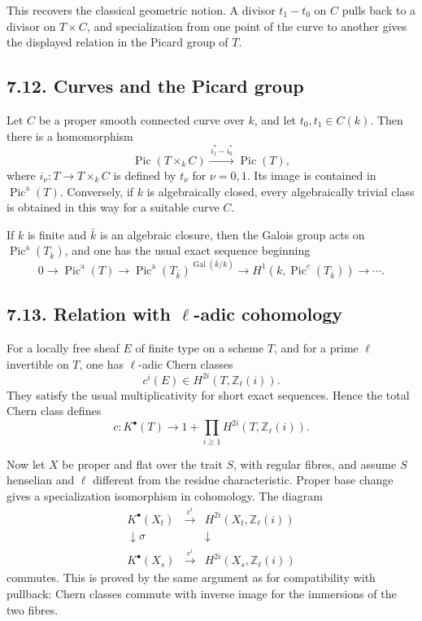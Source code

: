 \documentclass[11pt]{article}
\theoremstyle{plain}
\theoremstyle{definition}
\theoremstyle{remark}
\newcommand{\ZZ}{\mathbb Z}
\DeclareMathOperator{\Pic}{Pic}
\newcommand{\longto}{\longrightarrow}
\providecommand{\xto}[1]{\xrightarrow{#1}}
\begin{document}
This recovers the classical geometric notion. A divisor $t_1-t_0$ on $C$ pulls back to a divisor on $T\times C$, and specialization from one point of the curve to another gives the displayed relation in the Picard group of $T$.

\subsection*{7.12. Curves and the Picard group}

Let $C$ be a proper smooth connected curve over $k$, and let $t_0,t_1\in C(k)$. Then there is a homomorphism
\[
\Pic(T\times_k C)\xto{\,i_1^*-i_0^*\,}\Pic(T),
\]
where $i_\nu:T\to T\times_k C$ is defined by $t_\nu$ for $\nu=0,1$. Its image is contained in $\Pic^{\mathrm a}(T)$. Conversely, if $k$ is algebraically closed, every algebraically trivial class is obtained in this way for a suitable curve $C$.

If $k$ is finite and $\bar k$ is an algebraic closure, then the Galois group acts on $\Pic^{\mathrm a}(T_{\bar k})$, and one has the usual exact sequence beginning
\[
0\longto\Pic^{\mathrm a}(T)
\longto\Pic^{\mathrm a}(T_{\bar k})^{\operatorname{Gal}(\bar k/k)}
\longto H^1(k,\Pic^c(T_{\bar k}))\longto\cdots .
\]

\subsection*{7.13. Relation with $\ell$-adic cohomology}

For a locally free sheaf $E$ of finite type on a scheme $T$, and for a prime $\ell$ invertible on $T$, one has $\ell$-adic Chern classes
\[
c^i(E)\in H^{2i}(T,\ZZ_\ell(i)).
\]
They satisfy the usual multiplicativity for short exact sequences. Hence the total Chern class defines
\[
c:K^\bullet(T)\longto
1+\prod_{i\geq1}H^{2i}(T,\ZZ_\ell(i)).
\]

Now let $X$ be proper and flat over the trait $S$, with regular fibres, and assume $S$ henselian and $\ell$ different from the residue characteristic. Proper base change gives a specialization isomorphism in cohomology. The diagram
\[
\begin{array}{ccc}
K^\bullet(X_t)&\xto{\,c^i\,}&H^{2i}(X_t,\ZZ_\ell(i))\\
\downarrow\scriptstyle\sigma&&\downarrow\\
K^\bullet(X_s)&\xto{\,c^i\,}&H^{2i}(X_s,\ZZ_\ell(i))
\end{array}
\]
commutes. This is proved by the same argument as for compatibility with pullback: Chern classes commute with inverse image for the immersions of the two fibres.
\end{document}
